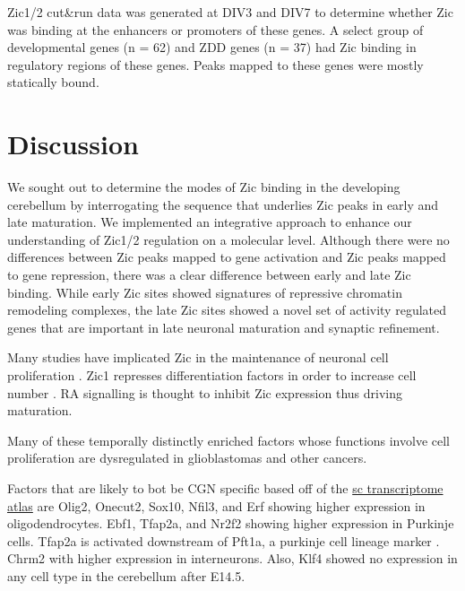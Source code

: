 \documentclass[fleqn,10pt,twocolumn]{wlscirep}
\begin{document}
Zic1/2 cut&run data was generated at DIV3 and DIV7 to determine whether Zic was binding at the enhancers or promoters of these genes. A select group of developmental genes (n = 62) and ZDD genes (n = 37) had Zic binding in regulatory regions of these genes. Peaks mapped to these genes were mostly statically bound. 



\section*{Discussion}

We sought out to determine the modes of Zic binding in the developing cerebellum by interrogating the sequence that underlies Zic peaks in early and late maturation. We implemented an integrative approach to enhance our understanding of Zic1/2 regulation on a molecular level. Although there were no differences between Zic peaks mapped to gene activation and Zic peaks mapped to gene repression, there was a clear difference between early and late Zic binding. While early Zic sites showed signatures of repressive chromatin remodeling complexes, the late Zic sites showed a novel set of activity regulated genes that are important in late neuronal maturation and synaptic refinement. 



Many studies have implicated Zic in the maintenance of neuronal cell proliferation \cite{Lim2007Zic3Cells, Janesick2013ErfNeurogensis, Aruga2002Zic1Differentiation, Ebert2003Zic1Autoregulation}. Zic1 represses differentiation factors in order to increase cell number \cite{Aruga2002Zic1Differentiation}. RA signalling is thought to inhibit Zic expression \cite{Janesic2013ErfNeurogenisis} thus driving maturation.


Many of these temporally distinctly enriched factors whose functions involve cell proliferation are dysregulated in glioblastomas and other cancers. 





Factors that are likely to bot be CGN specific based off of the \href{https://apps.kaessmannlab.org/sc-cerebellum-transcriptome/}{sc transcriptome atlas} \cite{} are Olig2, Onecut2, Sox10, Nfil3, and Erf showing higher expression in oligodendrocytes. Ebf1, Tfap2a, and Nr2f2 showing higher expression in Purkinje cells. Tfap2a is activated downstream of Pft1a, a purkinje cell lineage marker \cite{Jin2015Tfap2aRetinogenisis, Lowenstein2021Olig3Development}. Chrm2 with higher expression in interneurons. Also, Klf4 showed no expression in any cell type in the cerebellum after E14.5. 
\end{document}
